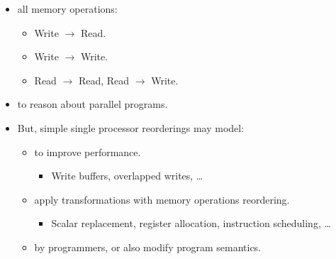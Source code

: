 \begin{frame}[t]
\begin{itemize}
  \item {}  all memory operations:
    \begin{itemize}
      \item Write $\rightarrow$ Read.
      \item Write $\rightarrow$ Write.
      \item Read $\rightarrow$ Read, Read $\rightarrow$ Write.
    \end{itemize}

  \item {} to reason about parallel programs.

  \item But, simple single processor reorderings may   
         model:
    \begin{itemize}
      \item {} to improve performance.
        \begin{itemize}
          \item Write buffers, overlapped writes, \ldots
        \end{itemize}
      \item {} apply transformations with memory operations reordering.
        \begin{itemize}
          \item Scalar replacement, register allocation, instruction scheduling, \ldots
        \end{itemize}
      \item {} by programmers, or
             also modify program semantics.
    \end{itemize}
\end{itemize}
\end{frame}

